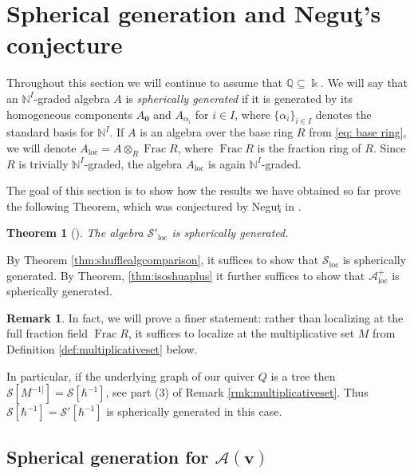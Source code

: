\documentclass[11pt,reqno]{amsart}
\renewcommand{\mathbf}{\mathbold}
\numberwithin{equation}{section}
\newtheorem{Theorem}[equation]{Theorem}
\theoremstyle{definition}
\newtheorem{Remark}[equation]{Remark}
\newcommand{\cA}{\mathcal{A}}
\newcommand{\cS}{\mathcal{S}}
\newcommand{\bv}{\mathbf{v}}
\newcommand{\NN}{\mathbb{N}}
\newcommand{\QQ}{\mathbb{Q}}
\newcommand{\kk}{\Bbbk}
\renewcommand{\bv}{\mathbf{v}} %
\newcommand{\loc}{\mathrm{loc}} %
\newcommand{\quiver}{Q}
\newcommand{\vertexset}{I}
\newcommand{\base}{R}
\newcommand{\qzast}{\cA}
\newcommand{\qzastplus}{\cA^{+}}
\newcommand{\shu}{\cS}
\begin{document}
\section{Spherical generation and Negu{\c t}'s conjecture}
\label{sec:spherical}
Throughout this section we will continue to assume that $\QQ \subseteq \kk$. 
We will say that an $\NN^\vertexset$-graded algebra $A$ is \emph{spherically generated} if it is generated by its homogeneous components $A_{\mathbf{0}}$ and $A_{\alpha_i}$ for $i \in \vertexset$, where $\{\alpha_i\}_{i \in \vertexset}$ denotes the standard basis for $\NN^\vertexset$.  
If $A$ is an algebra over the base ring $\base $ from \eqref{eq: base ring}, we will denote  $A_\loc = A\otimes_\base \operatorname{Frac}\base$, where $\operatorname{Frac} \base$ is the fraction ring of $\base$.  Since $\base$ is trivially $\NN^\vertexset$-graded, the algebra $A_\loc$ is again $\NN^\vertexset$-graded.

The goal of this section is to show how the results we have obtained so far prove the following Theorem, which was conjectured by Negu{\c t} in \cite{Negut-2025}. 

\begin{Theorem}[\mbox{\cite[Conjecture 2.12]{Negut-2025}}]
  \label{thm:negut-conjecture}
The algebra $\cS'_\loc$ is spherically generated.
\end{Theorem}

By Theorem \ref{thm:shufflealgcomparison}, it suffices to show that $\cS_\loc$ is spherically generated. By Theorem, \ref{thm:isoshuaplus} it further suffices to show that $\qzastplus_\loc$ is spherically generated. 

\begin{Remark}
    In fact, we will prove a finer statement: rather than localizing at the full fraction field $\operatorname{Frac} \base$, it suffices to localize at the multiplicative set $M$ from Definition \ref{def:multiplicativeset} below. 
    
    In particular,  if the underlying graph of our quiver $\quiver$ is a tree then $\shu[M^{-1]}] = \shu[\hbar^{-1}]$, see part (3) of Remark \ref{rmk:multiplicativeset}. Thus $\shu[\hbar^{-1}] = \shu'[\hbar^{-1}]$ is spherically generated in this case. 
\end{Remark}

\subsection{Spherical generation for $\qzast(\bv)$}
\end{document}
